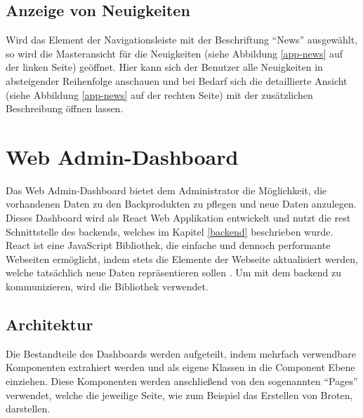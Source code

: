 
\clearpage

\subsection{Anzeige von Neuigkeiten}
Wird das Element der Navigationsleiste mit der Beschriftung \enquote{News} ausgewählt, so wird die Masteransicht für die Neuigkeiten (siehe Abbildung \ref{app-news} auf der linken Seite) geöffnet. Hier kann sich der Benutzer alle Neuigkeiten in absteigender Reihenfolge anschauen und bei Bedarf sich die detaillierte Ansicht  (siehe Abbildung \ref{app-news} auf der rechten Seite) mit der zusätzlichen Beschreibung öffnen lassen.


\clearpage

\section{Web Admin-Dashboard}
Das Web Admin-Dashboard bietet dem Administrator die Möglichkeit, die vorhandenen Daten zu den Backprodukten zu pflegen und neue Daten anzulegen. Dieses Dashboard wird als React Web Applikation entwickelt und nutzt die \gls{rest} Schnittstelle des \gls{backend}s, welches im Kapitel \ref{backend} beschrieben wurde. React ist eine JavaScript Bibliothek, die einfache und dennoch performante Webseiten ermöglicht, indem stets die Elemente der Webseite aktualisiert werden, welche tatsächlich neue Daten repräsentieren sollen \cite{react}.
Um mit dem \gls{backend} zu kommunizieren, wird die Bibliothek  verwendet.

\subsection{Architektur}
Die Bestandteile des Dashboards werden aufgeteilt, indem mehrfach verwendbare Komponenten extrahiert werden und als eigene Klassen in die Component Ebene einziehen. Diese Komponenten werden anschließend von den sogenannten \enquote{Pages} verwendet, welche die jeweilige Seite, wie zum Beispiel das Erstellen von Broten, darstellen.

